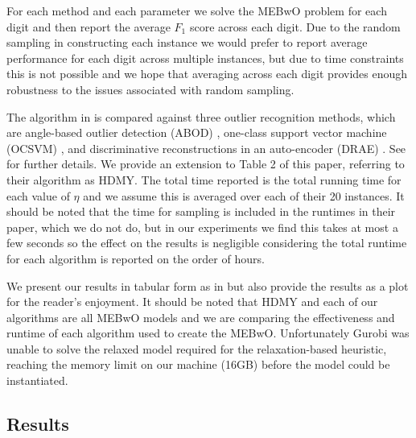 \documentclass[11pt,twoside]{report}
\theoremstyle{definition}
\numberwithin{theorem}{section}
\numberwithin{definition}{section}
\numberwithin{lemma}{section}
\numberwithin{proposition}{section}
\numberwithin{equation}{section}
\numberwithin{figure}{section}
\begin{document}
For each method and each parameter we solve the MEBwO problem for each digit and then report the average $F_1$ score across each digit. Due to the random sampling in constructing each instance we would prefer to report average performance for each digit across multiple instances, but due to time constraints this is not possible and we hope that averaging across each digit provides enough robustness to the issues associated with random sampling.

The algorithm in \cite{huding} is compared against three outlier recognition methods, which are angle-based outlier detection (ABOD) \cite{abod}, one-class support vector machine (OCSVM) \cite{ocsvm}, and discriminative reconstructions in an auto-encoder (DRAE) \cite{drae}. See \cite{huding} for further details. We provide an extension to Table 2 of this paper, referring to their algorithm as HDMY. The total time reported is the total running time for each value of $\eta$ and we assume this is averaged over each of their 20 instances. It should be noted that the time for sampling is included in the runtimes in their paper, which we do not do, but in our experiments we find this takes at most a few seconds so the effect on the results is negligible considering the total runtime for each algorithm is reported on the order of hours.

We present our results in tabular form as in \cite{huding} but also provide the results as a plot for the reader's enjoyment. It should be noted that HDMY and each of our algorithms are all MEBwO models and we are comparing the effectiveness and runtime of each algorithm used to create the MEBwO. Unfortunately Gurobi was unable to solve the relaxed model required for the relaxation-based heuristic, reaching the memory limit on our machine (16GB) before the model could be instantiated.

\subsection{Results}
\end{document}
